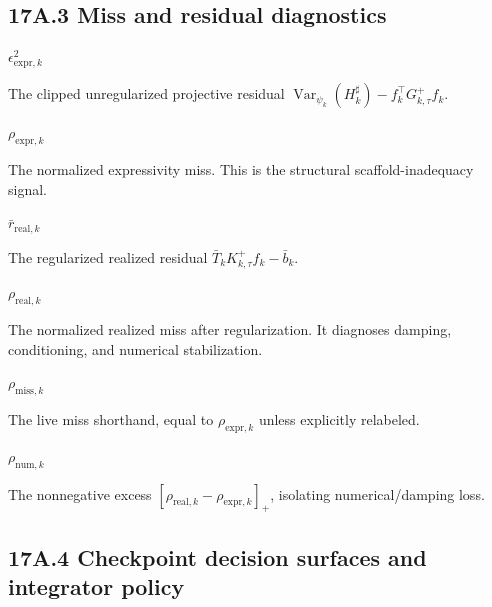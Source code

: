 \documentclass[10pt]{article}
\newcommand{\sym}[2]{%
  \noindent\begin{minipage}[t]{0.29\textwidth}\raggedright\textbf{\ensuremath{#1}}\end{minipage}%
  \hfill
  \begin{minipage}[t]{0.68\textwidth}\raggedright #2\end{minipage}\par\vspace{0.22em}}
\begin{document}
\subsection*{17A.3 Miss and residual diagnostics}

\sym{\epsilon_{\mathrm{expr},k}^2}{The clipped unregularized projective residual $\operatorname{Var}_{\psi_k}(H_k^\sharp)-f_k^\top G_{k,\tau}^+f_k$.}
\sym{\rho_{\mathrm{expr},k}}{The normalized expressivity miss. This is the structural scaffold-inadequacy signal.}
\sym{\bar r_{\mathrm{real},k}}{The regularized realized residual $\bar T_kK_{k,\tau}^{+}f_k-\bar b_k$.}
\sym{\rho_{\mathrm{real},k}}{The normalized realized miss after regularization. It diagnoses damping, conditioning, and numerical stabilization.}
\sym{\rho_{\mathrm{miss},k}}{The live miss shorthand, equal to $\rho_{\mathrm{expr},k}$ unless explicitly relabeled.}
\sym{\rho_{\mathrm{num},k}}{The nonnegative excess $[\rho_{\mathrm{real},k}-\rho_{\mathrm{expr},k}]_+$, isolating numerical/damping loss.}

\subsection*{17A.4 Checkpoint decision surfaces and integrator policy}
\end{document}
